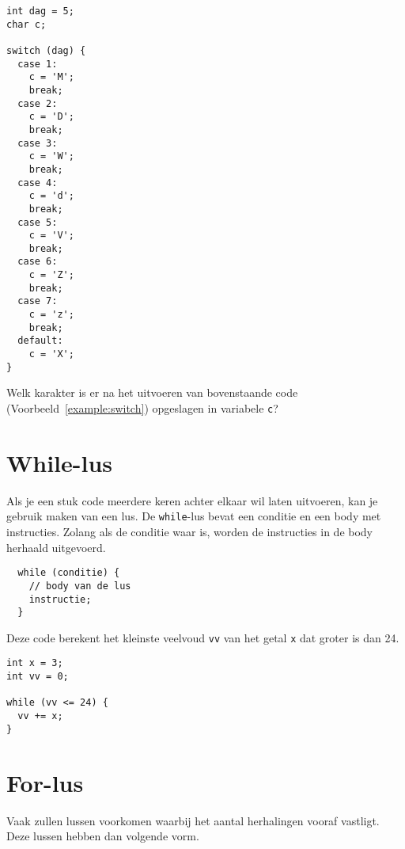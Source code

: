 \documentclass[11pt,fleqn]{book} %
\begin{document}
\begin{example}
	\label{example:switch}
	\phantom{ }
	\begin{verbatim}
int dag = 5;
char c;

switch (dag) {
  case 1:
    c = 'M';
    break;
  case 2:
    c = 'D';
    break;
  case 3:
    c = 'W';
    break;
  case 4:
    c = 'd';
    break;
  case 5:
    c = 'V';
    break;
  case 6:
    c = 'Z';
    break;
  case 7:
    c = 'z';
    break;
  default:
    c = 'X';
}
	\end{verbatim}
\end{example}

\begin{exercise}
	Welk karakter is er na het uitvoeren van bovenstaande code (Voorbeeld~\ref{example:switch}) opgeslagen in variabele \texttt{c}?
\end{exercise}

\section{While-lus}
Als je een stuk code meerdere keren achter elkaar wil laten uitvoeren, kan je gebruik maken van een lus. De \texttt{while}-lus bevat een conditie en een body met instructies. Zolang als de conditie waar is, worden de instructies in de body herhaald uitgevoerd.

\begin{definition}[While]
	\phantom{ }
	\begin{verbatim}
  while (conditie) {
    // body van de lus
    instructie;
  }
	\end{verbatim}
	\vspace{0cm}
\end{definition}

\begin{example}[While]
	Deze code berekent het kleinste veelvoud \texttt{vv} van het getal \texttt{x} dat groter is dan 24.
	\begin{verbatim}
int x = 3;
int vv = 0;

while (vv <= 24) {
  vv += x;
}
	\end{verbatim}
\end{example}

\section{For-lus}
Vaak zullen lussen voorkomen waarbij het aantal herhalingen vooraf vastligt. Deze lussen hebben dan volgende vorm.
\end{document}
